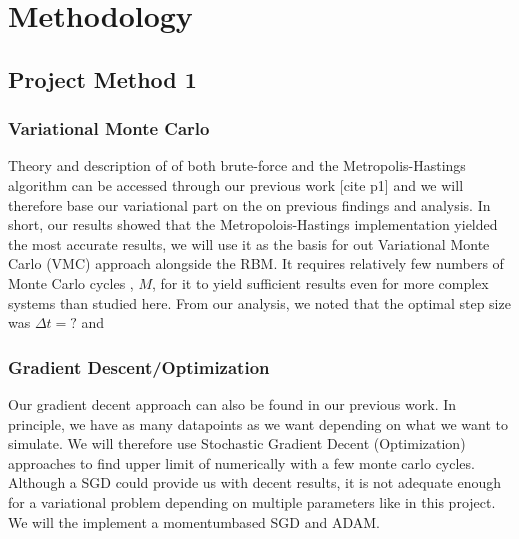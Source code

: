 \section{Methodology}\label{sec:Method}

\subsection{Project Method 1}\label{sec:project method}

\subsubsection{Variational Monte Carlo}

Theory and description of of both brute-force and the Metropolis-Hastings algorithm can be accessed through our previous work [cite p1] and we will therefore base our variational part on the on previous findings and analysis. In short, our results showed that the Metropolois-Hastings implementation yielded the most accurate results, we will use it as the basis for out Variational Monte Carlo (VMC) approach alongside the RBM. It requires relatively few numbers of Monte Carlo cycles , $M$, for it to yield sufficient results even for more complex systems than studied here. From our analysis, we noted that the optimal step size was $\Delta t = ?$ and 


\subsubsection{Gradient Descent/Optimization}

Our gradient decent approach can also be found in our previous work. In principle, we have as many datapoints as we want depending on what we want to simulate. We will therefore use Stochastic Gradient Decent (Optimization) approaches to find upper limit of numerically with a few monte carlo cycles. Although a SGD could provide us with decent results, it is not adequate enough for a variational problem depending on multiple parameters like in this project. We will the implement a momentumbased SGD and ADAM. 

